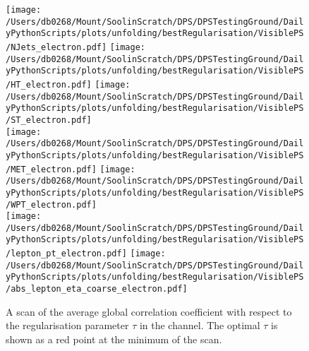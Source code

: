 \begin{figure}[hp]
	\centering
	\texttt{[image: /Users/db0268/Mount/SoolinScratch/DPS/DPSTestingGround/DailyPythonScripts/plots/unfolding/bestRegularisation/VisiblePS/NJets\_electron.pdf]}
	\texttt{[image: /Users/db0268/Mount/SoolinScratch/DPS/DPSTestingGround/DailyPythonScripts/plots/unfolding/bestRegularisation/VisiblePS/HT\_electron.pdf]}
	\texttt{[image: /Users/db0268/Mount/SoolinScratch/DPS/DPSTestingGround/DailyPythonScripts/plots/unfolding/bestRegularisation/VisiblePS/ST\_electron.pdf]}\\
	\texttt{[image: /Users/db0268/Mount/SoolinScratch/DPS/DPSTestingGround/DailyPythonScripts/plots/unfolding/bestRegularisation/VisiblePS/MET\_electron.pdf]}
	\texttt{[image: /Users/db0268/Mount/SoolinScratch/DPS/DPSTestingGround/DailyPythonScripts/plots/unfolding/bestRegularisation/VisiblePS/WPT\_electron.pdf]} \\
	\texttt{[image: /Users/db0268/Mount/SoolinScratch/DPS/DPSTestingGround/DailyPythonScripts/plots/unfolding/bestRegularisation/VisiblePS/lepton\_pt\_electron.pdf]}
	\texttt{[image: /Users/db0268/Mount/SoolinScratch/DPS/DPSTestingGround/DailyPythonScripts/plots/unfolding/bestRegularisation/VisiblePS/abs\_lepton\_eta\_coarse\_electron.pdf]}
	\caption[A scan of the average global correlation coefficient with respect to the regularisation parameter $\tau$ in the \eJets{} channel. The optimal $\tau$ is shown as a red point at the minimum of the scan.]{A scan of the average global correlation coefficient with respect to the regularisation parameter $\tau$ in the \eJets{} channel. The optimal $\tau$ is shown as a red point at the minimum of the scan.}
	\label{fig:TauE}
\end{figure}

